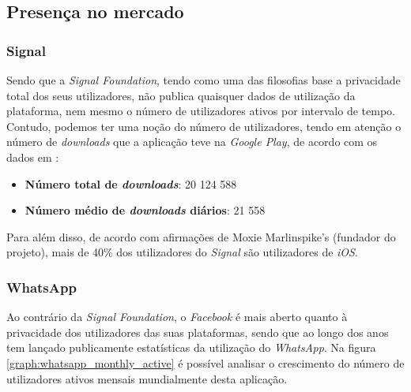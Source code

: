 \subsection{Presença no mercado}

\subsubsection{Signal}
Sendo que a \textit{Signal Foundation}, tendo como uma das filosofias base a privacidade total dos seus utilizadores, não publica quaisquer dados de utilização da plataforma, nem mesmo o número de utilizadores ativos por intervalo de tempo. Contudo, podemos ter uma noção do número de utilizadores, tendo em atenção o número de \textit{downloads} que a aplicação teve na \textit{Google Play}, de acordo com os dados em 
\cite{signal_android}:

\begin{itemize}
   \item \textbf{Número total de \textit{downloads}}: 20 124 588
   \item \textbf{Número médio de \textit{downloads} diários}: 21 558
\end{itemize}

Para além disso, de acordo com afirmações de Moxie Marlinspike's (fundador do projeto), mais de 40\% dos utilizadores do \textit{Signal} são utilizadores de \textit{iOS}. \cite{signal_ios}

\subsubsection{WhatsApp}
Ao contrário da \textit{Signal Foundation}, o \textit{Facebook} é mais aberto quanto à privacidade dos utilizadores das suas plataformas, sendo que ao longo dos anos tem lançado publicamente estatísticas da utilização do \textit{WhatsApp}. Na figura \ref{graph:whatsapp_monthly_active} é possível analisar o crescimento do número de utilizadores ativos mensais mundialmente desta aplicação.

